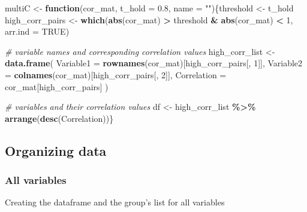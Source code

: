 \documentclass[
]{article}
\newenvironment{Shaded}{\begin{snugshade}}{\end{snugshade}}
\newcommand{\AttributeTok}[1]{\textcolor[rgb]{0.13,0.29,0.53}{#1}}
\newcommand{\CommentTok}[1]{\textcolor[rgb]{0.56,0.35,0.01}{\textit{#1}}}
\newcommand{\ConstantTok}[1]{\textcolor[rgb]{0.56,0.35,0.01}{#1}}
\newcommand{\ControlFlowTok}[1]{\textcolor[rgb]{0.13,0.29,0.53}{\textbf{#1}}}
\newcommand{\DecValTok}[1]{\textcolor[rgb]{0.00,0.00,0.81}{#1}}
\newcommand{\FloatTok}[1]{\textcolor[rgb]{0.00,0.00,0.81}{#1}}
\newcommand{\FunctionTok}[1]{\textcolor[rgb]{0.13,0.29,0.53}{\textbf{#1}}}
\newcommand{\NormalTok}[1]{#1}
\newcommand{\OtherTok}[1]{\textcolor[rgb]{0.56,0.35,0.01}{#1}}
\newcommand{\SpecialCharTok}[1]{\textcolor[rgb]{0.81,0.36,0.00}{\textbf{#1}}}
\newcommand{\StringTok}[1]{\textcolor[rgb]{0.31,0.60,0.02}{#1}}
\begin{document}
\begin{Shaded}
\begin{Highlighting}[]
\NormalTok{multiC }\OtherTok{\textless{}{-}} \ControlFlowTok{function}\NormalTok{(cor\_mat, }\AttributeTok{t\_hold =} \FloatTok{0.8}\NormalTok{, }\AttributeTok{name =} \StringTok{""}\NormalTok{)\{threshold }\OtherTok{\textless{}{-}}\NormalTok{ t\_hold}
\NormalTok{high\_corr\_pairs }\OtherTok{\textless{}{-}} \FunctionTok{which}\NormalTok{(}\FunctionTok{abs}\NormalTok{(cor\_mat) }\SpecialCharTok{\textgreater{}}\NormalTok{ threshold }\SpecialCharTok{\&} \FunctionTok{abs}\NormalTok{(cor\_mat) }\SpecialCharTok{\textless{}} \DecValTok{1}\NormalTok{, }\AttributeTok{arr.ind =} \ConstantTok{TRUE}\NormalTok{)}

\CommentTok{\# variable names and corresponding correlation values}
\NormalTok{high\_corr\_list }\OtherTok{\textless{}{-}} \FunctionTok{data.frame}\NormalTok{(}
  \AttributeTok{Variable1 =} \FunctionTok{rownames}\NormalTok{(cor\_mat)[high\_corr\_pairs[, }\DecValTok{1}\NormalTok{]],}
  \AttributeTok{Variable2 =} \FunctionTok{colnames}\NormalTok{(cor\_mat)[high\_corr\_pairs[, }\DecValTok{2}\NormalTok{]],}
  \AttributeTok{Correlation =}\NormalTok{ cor\_mat[high\_corr\_pairs]}
\NormalTok{)}

\CommentTok{\# variables and their correlation values}
\NormalTok{df }\OtherTok{\textless{}{-}}\NormalTok{ high\_corr\_list }\SpecialCharTok{\%\textgreater{}\%}
  \FunctionTok{arrange}\NormalTok{(}\FunctionTok{desc}\NormalTok{(Correlation))\}}
\end{Highlighting}
\end{Shaded}

\subsection{Organizing data}\label{organizing-data}

\subsubsection{All variables}\label{all-variables}

Creating the dataframe and the group's list for all variables
\end{document}

